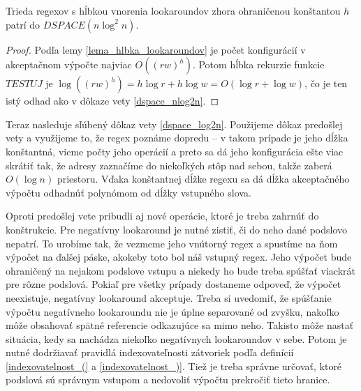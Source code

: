 \begin{dosledok}
Trieda regexov s hĺbkou vnorenia lookaroundov zhora ohraničenou konštantou $h$ patrí do $DSPACE(n\log^2 n)$.
\end{dosledok}
\begin{proof}
Podľa lemy \ref{lema_hlbka_lookaroundov} je počet konfigurácií v akceptačnom výpočte najviac $O((rw)^h)$. Potom hĺbka rekurzie funkcie $TESTUJ$ je $\log((rw)^h) = h\log r + h\log w = O(\log r+\log w)$, čo je ten istý odhad ako v dôkaze vety \ref{dspace_nlog2n}.
\end{proof}

Teraz nasleduje sľúbený dôkaz vety \ref{dspace_log2n}. Použijeme dôkaz predošlej vety a využijeme to, že regex poznáme dopredu -- v takom prípade je jeho dĺžka konštantná, vieme počty jeho operácií a preto sa dá jeho konfigurácia ešte viac skrátiť tak, že adresy zaznačíme do niekoľkých stôp nad sebou, takže zaberá $O(\log n)$ priestoru. Vďaka konštantnej dĺžke regexu sa dá dĺžka akceptačného výpočtu odhadnúť polynómom od dĺžky vstupného slova.

Oproti predošlej vete pribudli aj nové operácie, ktoré je treba zahrnúť do konštrukcie. Pre negatívny lookaround je nutné zistiť, či do neho dané podslovo nepatrí. To urobíme tak, že vezmeme jeho vnútorný regex a spustíme na ňom výpočet na ďalšej páske, akokeby toto bol náš vstupný regex. Jeho výpočet bude ohraničený na nejakom podslove vstupu a niekedy ho bude treba spúšťať viackrát pre rôzne podslová. Pokiaľ pre všetky prípady dostaneme odpoveď, že výpočet neexistuje, negatívny lookaround akceptuje. Treba si uvedomiť, že spúšťanie výpočtu negatívneho lookaroundu nie je úplne separované od zvyšku, nakoľko môže obsahovať spätné referencie odkazujúce sa mimo neho. Takisto môže nastať situácia, kedy sa nachádza niekoľko negatívnych lookaroundov v sebe. Potom je nutné dodržiavať pravidlá indexovateľnosti zátvoriek podľa definícií \ref{indexovatelnost_(} a \ref{indexovatelnost_)}. Tiež je treba správne určovať, ktoré podslová sú správnym vstupom a nedovoliť výpočtu prekročiť tieto hranice.

